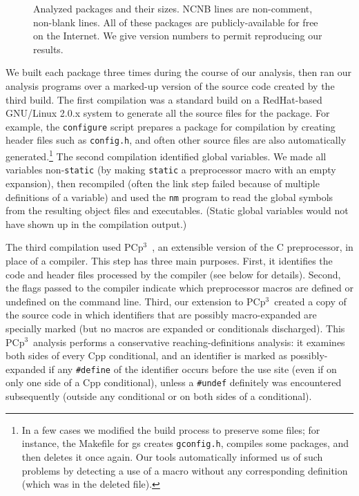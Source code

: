 \documentclass[10pt]{article}
\newcommand{\pcp}{\mbox{\textsf{PCp}$^3$}}
\newcommand{\pkg}[1]{\textsf{#1}}
\newcommand{\file}[1]{\texttt{#1}}
\newcommand{\ppd}[1]{\texttt{\##1}}
\newcommand{\captionsmall}[1]{\caption[]{\small #1}}
\begin{document}
\begin{figure}
\centering
{\small
  \setlength{\tabcolsep}{.25em}
  
}
\captionsmall{Analyzed packages and their sizes.  NCNB lines are non-comment,
  non-blank lines.  All of these packages are publicly-available for free
  on the Internet.  We give version numbers to permit reproducing our results.}
\label{fig:packages}
\end{figure}

We built each package three times during the course of our analysis, then
ran our analysis programs over a marked-up version of the source code
created by the third build.  The first compilation was a standard build on
a RedHat-based GNU/Linux 2.0.x system to generate all the source files for
the package.  For example, the {\tt configure} script prepares a package
for compilation by creating header files such as \file{config.h}, and
often other source files are also automatically generated.\footnote{In a
  few cases we  modified the build process to preserve some files; for
  instance, the Makefile for \pkg{gs} creates \file{gconfig.h}, compiles
  some packages, and then deletes it once again.  Our tools automatically
  informed us of such problems by detecting a use of a macro
  without any corresponding definition (which was in the deleted file).}
The second compilation identified global variables.  We made all variables
non-{\tt static} (by making {\tt static} a preprocessor macro with an empty
expansion), then recompiled (often the link step failed because of multiple
definitions of a variable) and used the {\tt nm} program to read the global
symbols from the resulting object files and executables.  (Static global
variables would not have shown up in the compilation output.)


The third compilation used \pcp{}~\cite{CppAwareCAnalyses}, an extensible
version of the C preprocessor, in place of a compiler.  This step has three
main purposes.  First, it identifies the code and header files processed by
the compiler (see below for details).  Second, the flags passed to the
compiler indicate which preprocessor macros are defined or undefined on the
command line.  Third, our extension to \pcp\ created a copy of the source
code in which identifiers that are possibly macro-expanded are specially
marked (but no macros are expanded or conditionals discharged).  This \pcp\ 
analysis performs a conservative reaching-definitions analysis:  it
examines both sides of every Cpp conditional, and an identifier is marked
as possibly-expanded if any \ppd{define} of the identifier occurs before
the use site (even if on only one side of a Cpp conditional), unless a
\ppd{undef} definitely was encountered subsequently (outside any
conditional or on both sides of a conditional).
\end{document}
